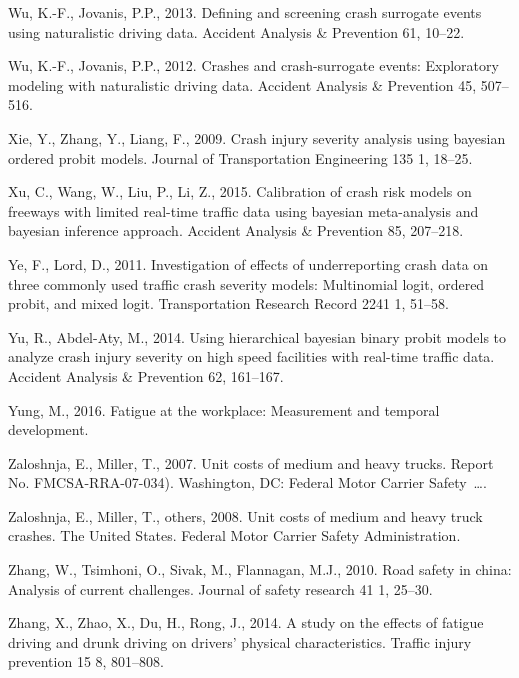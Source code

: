 \documentclass[12pt]{book}
\numberwithin{equation}{chapter}
\begin{document}
\leavevmode\hypertarget{ref-wu2013defining}{}%
Wu, K.-F., Jovanis, P.P., 2013. Defining and screening crash surrogate events using naturalistic driving data. Accident Analysis \& Prevention 61, 10--22.

\leavevmode\hypertarget{ref-wu2012crashes}{}%
Wu, K.-F., Jovanis, P.P., 2012. Crashes and crash-surrogate events: Exploratory modeling with naturalistic driving data. Accident Analysis \& Prevention 45, 507--516.

\leavevmode\hypertarget{ref-xie2009crash}{}%
Xie, Y., Zhang, Y., Liang, F., 2009. Crash injury severity analysis using bayesian ordered probit models. Journal of Transportation Engineering 135 1, 18--25.

\leavevmode\hypertarget{ref-xu2015calibration}{}%
Xu, C., Wang, W., Liu, P., Li, Z., 2015. Calibration of crash risk models on freeways with limited real-time traffic data using bayesian meta-analysis and bayesian inference approach. Accident Analysis \& Prevention 85, 207--218.

\leavevmode\hypertarget{ref-ye2011investigation}{}%
Ye, F., Lord, D., 2011. Investigation of effects of underreporting crash data on three commonly used traffic crash severity models: Multinomial logit, ordered probit, and mixed logit. Transportation Research Record 2241 1, 51--58.

\leavevmode\hypertarget{ref-yu2014using}{}%
Yu, R., Abdel-Aty, M., 2014. Using hierarchical bayesian binary probit models to analyze crash injury severity on high speed facilities with real-time traffic data. Accident Analysis \& Prevention 62, 161--167.

\leavevmode\hypertarget{ref-yung2016fatigue}{}%
Yung, M., 2016. Fatigue at the workplace: Measurement and temporal development.

\leavevmode\hypertarget{ref-zaloshnja2007unit}{}%
Zaloshnja, E., Miller, T., 2007. Unit costs of medium and heavy trucks. Report No. FMCSA-RRA-07-034). Washington, DC: Federal Motor Carrier Safety~\ldots{}.

\leavevmode\hypertarget{ref-zaloshnja2008unit}{}%
Zaloshnja, E., Miller, T., others, 2008. Unit costs of medium and heavy truck crashes. The United States. Federal Motor Carrier Safety Administration.

\leavevmode\hypertarget{ref-zhang2010road}{}%
Zhang, W., Tsimhoni, O., Sivak, M., Flannagan, M.J., 2010. Road safety in china: Analysis of current challenges. Journal of safety research 41 1, 25--30.

\leavevmode\hypertarget{ref-zhang2014study}{}%
Zhang, X., Zhao, X., Du, H., Rong, J., 2014. A study on the effects of fatigue driving and drunk driving on drivers' physical characteristics. Traffic injury prevention 15 8, 801--808.
\end{document}
